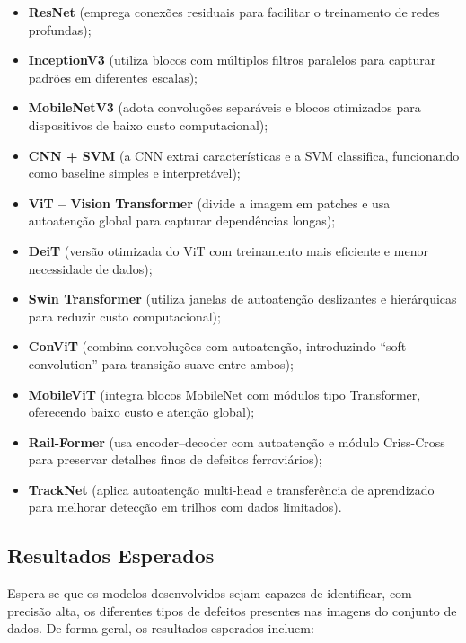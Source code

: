 \begin{itemize}
    \item \textbf{ResNet} (emprega conexões residuais para facilitar o treinamento de redes profundas);
    \item \textbf{InceptionV3} (utiliza blocos com múltiplos filtros paralelos para capturar padrões em diferentes escalas);
    \item \textbf{MobileNetV3} (adota convoluções separáveis e blocos otimizados para dispositivos de baixo custo computacional);

    \item \textbf{CNN + SVM} (a CNN extrai características e a SVM classifica, funcionando como baseline simples e interpretável);

    \item \textbf{ViT – Vision Transformer} (divide a imagem em patches e usa autoatenção global para capturar dependências longas);
    \item \textbf{DeiT} (versão otimizada do ViT com treinamento mais eficiente e menor necessidade de dados);
    \item \textbf{Swin Transformer} (utiliza janelas de autoatenção deslizantes e hierárquicas para reduzir custo computacional);

    \item \textbf{ConViT} (combina convoluções com autoatenção, introduzindo “soft convolution” para transição suave entre ambos);
    \item \textbf{MobileViT} (integra blocos MobileNet com módulos tipo Transformer, oferecendo baixo custo e atenção global);

    \item \textbf{Rail-Former} (usa encoder–decoder com autoatenção e módulo Criss-Cross para preservar detalhes finos de defeitos ferroviários);
    \item \textbf{TrackNet} (aplica autoatenção multi-head e transferência de aprendizado para melhorar detecção em trilhos com dados limitados).
\end{itemize}

\subsection{Resultados Esperados}

Espera-se que os modelos desenvolvidos sejam capazes de identificar, com precisão alta, os diferentes tipos de defeitos presentes nas imagens do conjunto de dados.
De forma geral, os resultados esperados incluem:

